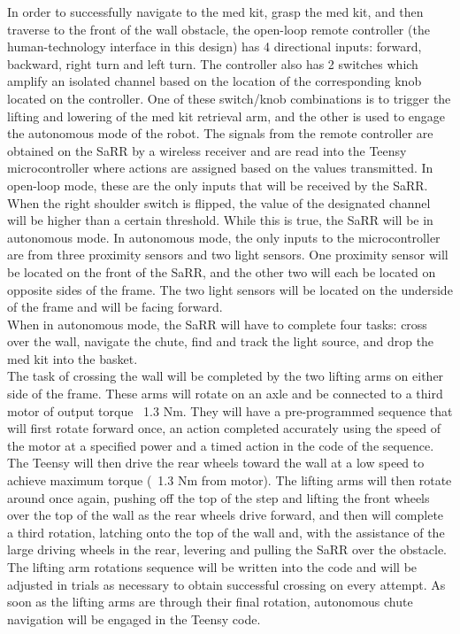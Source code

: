 \documentclass[12pt]{article}
\begin{document}
In order to successfully navigate to the med kit, grasp the med kit, and then traverse to the front of the wall obstacle, the open-loop remote controller (the human-technology interface in this design) has 4 directional inputs: forward, backward, right turn and left turn. The controller also has 2 switches which amplify an isolated channel based on the location of the corresponding knob located on the controller. One of these switch/knob combinations is to trigger the lifting and lowering of the med kit retrieval arm, and the other is used to engage the autonomous mode of the robot. The signals from the remote controller are obtained on the SaRR by a wireless receiver and are read into the Teensy microcontroller where actions are assigned based on the values transmitted.  In open-loop mode, these are the only inputs that will be received by the SaRR.\\

When the right shoulder switch is flipped, the value of the designated channel will be higher than a certain threshold. While this is true, the SaRR will be in autonomous mode. In autonomous mode, the only inputs to the microcontroller are from three proximity sensors and two light sensors. One proximity sensor will be located on the front of the SaRR, and the other two will each be located on opposite sides of the frame. The two light sensors will be located on the underside of the frame and will be facing forward. \\When in autonomous mode, the SaRR will have to complete four tasks: cross over the wall, navigate the chute, find and track the light source, and drop the med kit into the basket. \\

The task of crossing the wall will be completed by the two lifting arms on either side of the frame. These arms will rotate on an axle and be connected to a third motor of output torque ~1.3 Nm. They will have a pre-programmed sequence that will first rotate forward once, an action completed accurately using the speed of the motor at a specified power and a timed action in the code of the sequence. The Teensy will then drive the rear wheels toward the wall at a low speed to achieve maximum torque (~1.3 Nm from motor). The lifting arms will then rotate around once again, pushing off the top of the step and lifting the front wheels over the top of the wall as the rear wheels drive forward, and then will complete a third rotation, latching onto the top of the wall and, with the assistance of the large driving wheels in the rear, levering and pulling the SaRR over the obstacle. The lifting arm rotations sequence will be written into the code and will be adjusted in trials as necessary to obtain successful crossing on every attempt. As soon as the lifting arms are through their final rotation, autonomous chute navigation will be engaged in the Teensy code.\\
\end{document}
